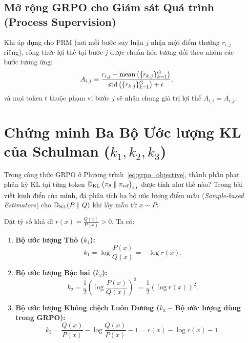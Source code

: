 \subsection{Mở rộng GRPO cho Giám sát Quá trình (Process Supervision)}
Khi áp dụng cho PRM (nơi mỗi bước suy luận $j$ nhận một điểm thưởng $r_{i, j}$ riêng), công thức lợi thế tại bước $j$ được chuẩn hóa tương đối theo nhóm các bước tương ứng:
\begin{equation}
    A_{i, j} = \frac{r_{i, j} - \operatorname{\mathrm{mean}}\big(\{r_{k, j}\}_{k=1}^G\big)}{\operatorname{\mathrm{std}}\big(\{r_{k, j}\}_{k=1}^G\big) + \epsilon},
\end{equation}
và mọi token $t$ thuộc phạm vi bước $j$ sẽ nhận chung giá trị lợi thế $A_{i, t} = A_{i, j}$.

\section{Chứng minh Ba Bộ Ước lượng KL của Schulman ($k_1, k_2, k_3$)}
\label{sec:schulman_kl}

Trong công thức GRPO ở Phương trình~\eqref{eq:grpo_objective}, thành phần phạt phân kỳ KL tại từng token $\operatorname{\mathbb{D}_{\mathrm{KL}}}\big(\pi_\theta \parallel \pi_{\text{ref}}\big)_{i,t}$ được tính như thế nào?
Trong bài viết kinh điển của mình, \citet{schulman2020approximating} đã phân tích ba bộ ước lượng điểm mẫu (\textit{Sample-based Estimators}) cho $\operatorname{\mathbb{D}_{\mathrm{KL}}}(P \parallel Q)$ khi lấy mẫu từ $x \sim P$:

Đặt tỷ số khả dĩ $r(x) = \frac{Q(x)}{P(x)} > 0$. Ta có:

\begin{theorem}
\label{thm:schulman_kl}
\begin{enumerate}[label=(\alph*), leftmargin=1.2cm]
    \item \textbf{Bộ ước lượng Thô ($k_1$):}
    \begin{equation}
        k_1 = \log \frac{P(x)}{Q(x)} = -\log r(x).
    \end{equation}
    \item \textbf{Bộ ước lượng Bậc hai ($k_2$):}
    \begin{equation}
        k_2 = \frac{1}{2} \left( \log \frac{P(x)}{Q(x)} \right)^2 = \frac{1}{2} (\log r(x))^2.
    \end{equation}
    \item \textbf{Bộ ước lượng Không chệch Luôn Dương ($k_3$ -- Bộ ước lượng dùng trong GRPO):}
    \begin{equation}
        k_3 = \frac{Q(x)}{P(x)} - \log \frac{Q(x)}{P(x)} - 1 = r(x) - \log r(x) - 1.
        \label{eq:k3_estimator}
    \end{equation}
\end{enumerate}
\end{theorem}

